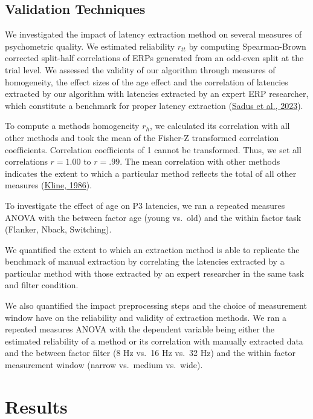 \documentclass[
  man]{apa7}
\begin{document}
\hypertarget{validation-techniques}{%
\subsection{Validation Techniques}\label{validation-techniques}}

We investigated the impact of latency extraction method on several measures of psychometric quality. We estimated reliability \(r_{tt}\) by computing Spearman-Brown corrected split-half correlations of ERPs generated from an odd-even split at the trial level. We assessed the validity of our algorithm through measures of homogeneity, the effect sizes of the age effect and the correlation of latencies extracted by our algorithm with latencies extracted by an expert ERP researcher, which constitute a benchmark for proper latency extraction (\protect\hyperlink{ref-sadus2023multiverse}{Sadus et al., 2023}).

To compute a methods homogeneity \(r_h\), we calculated its correlation with all other methods and took the mean of the Fisher-Z transformed correlation coefficients. Correlation coefficients of 1 cannot be transformed. Thus, we set all correlations \(r = 1.00\) to \(r = .99\). The mean correlation with other methods indicates the extent to which a particular method reflects the total of all other measures (\protect\hyperlink{ref-kline1986handbook}{Kline, 1986}).

To investigate the effect of age on P3 latencies, we ran a repeated measures ANOVA with the between factor age (young vs.~old) and the within factor task (Flanker, Nback, Switching).

We quantified the extent to which an extraction method is able to replicate the benchmark of manual extraction by correlating the latencies extracted by a particular method with those extracted by an expert researcher in the same task and filter condition.

We also quantified the impact preprocessing steps and the choice of measurement window have on the reliability and validity of extraction methods. We ran a repeated measures ANOVA with the dependent variable being either the estimated reliability of a method or its correlation with manually extracted data and the between factor filter (8 Hz vs.~16 Hz vs.~32 Hz) and the within factor measurement window (narrow vs.~medium vs.~wide).

\hypertarget{results}{%
\section{Results}\label{results}}
\end{document}

